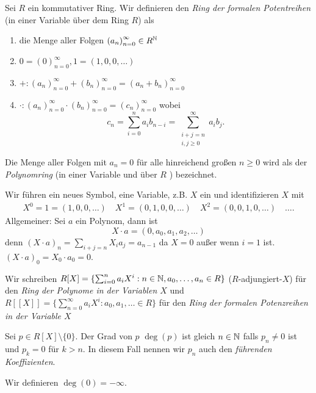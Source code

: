 \begin{definition}
	Sei $R$ ein kommutativer Ring. Wir definieren den \emph{Ring der formalen Potentreihen} (in einer Variable über dem Ring $R $) als 
	\begin{enumerate}
		\item die Menge aller Folgen $\left(a_{n}\right)^{\infty}_{n=0} \in R^{\mathbb{N}}$
		\item $0 = \left(0\right)^{\infty}_{n=0}, 1 = (1,0,0,\ldots)$ 
		\item $+: \left(a_{n}\right)^{\infty}_{n=0} + \left(b_{n}\right)^{\infty}_{n=0} = (a_{n} + b_{n})^{\infty}_{n=0}$ 
		\item $\cdot: \left(a_{n}\right)^{\infty}_{n=0} \cdot \left(b_{n}\right)^{\infty}_{n=0} = \left(c_{n}\right)^{\infty}_{n=0} $ wobei
			\[
				c_{n} = \sum_{i=0}^{n} a_{i} b_{n-i} = \sum_{\substack{i+j=n \\ i,j \geq 0}}^{\infty} a_{i} b_{j}
			.\] 
	\end{enumerate}
	Die Menge aller Folgen mit $a_{n} = 0$ für alle hinreichend großen $n \geq 0$ wird als der \emph{Polynomring} (in einer Variable und über $R$ ) bezeichnet.
\end{definition}


\begin{notation}
	Wir führen ein neues Symbol, eine Variable, z.B. $X$ ein und identifizieren $X$ mit
	\begin{align*}
		X^{0} = 1 = (1,0,0,\ldots) \quad X^{1} = (0,1,0,0,\ldots) \quad X^2 = (0,0,1,0,\ldots) \quad \ldots
	.\end{align*}
	Allgemeiner: Sei $a$ ein Polynom, dann ist
	\[
		X \cdot a = (0,a_0,a_1,a_2,\ldots)
	\]
	denn $(X\cdot a)_{n} = \sum_{i+j=n} X_{i} a_{j} = a_{n-1}$ 
	da $X = 0$ außer wenn $i = 1$ ist. $(X\cdot a)_{0} = X_0\cdot a_0 = 0$.

	Wir schreiben $R[X] = \{\sum_{i=0}^{n} a_{i} X^{i} : n \in \mathbb{N}, a_0,\ldots,a_{n} \in R\}$ ($R$-adjungiert-$X$) für den \emph{Ring der Polynome in der Variablen $X$}
	und $R[\![ X ]\!] = \{\sum_{n=0}^{\infty} a_{i} X^{i} : a_0,a_1,\ldots \in R\} $ für den \emph{Ring der formalen Potenzreihen in der Variable $X$}
\end{notation}

\begin{definition}
	Sei $p \in R[X] \setminus \{0\}$. Der Grad von $p$ $\deg(p)$ ist gleich $n \in \mathbb{N}$ falls $p_{n} \neq 0$ ist und
	$p_{k} = 0$ für $k> n$. In diesem Fall nennen wir $p_{n}$ auch den \emph{führenden Koeffizienten}.
	
	Wir definieren $\deg(0) = - \infty$.
\end{definition}

